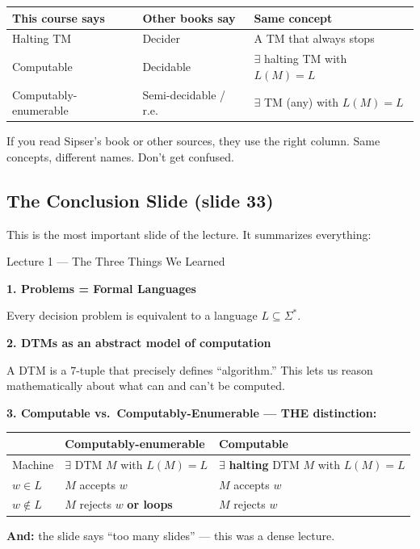 \documentclass[11pt,a4paper]{article}
\begin{document}
\begin{center}
\renewcommand{\arraystretch}{1.4}
\begin{tabular}{lll}
\toprule
\textbf{This course says} & \textbf{Other books say} & \textbf{Same concept} \\
\midrule
Halting TM & Decider & A TM that always stops \\
Computable & Decidable & $\exists$ halting TM with $L(M) = L$ \\
Computably-enumerable & Semi-decidable / r.e. & $\exists$ TM (any) with $L(M) = L$ \\
\bottomrule
\end{tabular}
\end{center}

If you read Sipser's book or other sources, they use the right column. Same concepts, different names. Don't get confused.


\subsection{The Conclusion Slide (slide 33)}

This is the most important slide of the lecture. It summarizes everything:

\begin{conceptbox}{Lecture 1 --- The Three Things We Learned}

\textbf{1. Problems = Formal Languages}

Every decision problem is equivalent to a language $L \subseteq \Sigma^*$.

\textbf{2. DTMs as an abstract model of computation}

A DTM is a 7-tuple that precisely defines ``algorithm.'' This lets us reason mathematically about what can and can't be computed.

\textbf{3. Computable vs.\ Computably-Enumerable --- THE distinction:}

\renewcommand{\arraystretch}{1.4}
\begin{center}
\begin{tabular}{p{3.5cm}p{5cm}p{5cm}}
\toprule
& \textbf{Computably-enumerable} & \textbf{Computable} \\
\midrule
Machine & $\exists$ DTM $M$ with $L(M) = L$ & $\exists$ \textbf{halting} DTM $M$ with $L(M) = L$ \\
$w \in L$ & $M$ accepts $w$ & $M$ accepts $w$ \\
$w \notin L$ & $M$ rejects $w$ \textbf{or loops} & $M$ rejects $w$ \\
\bottomrule
\end{tabular}
\end{center}

\textbf{And:} the slide says ``too many slides'' --- this was a dense lecture.
\end{conceptbox}
\end{document}
